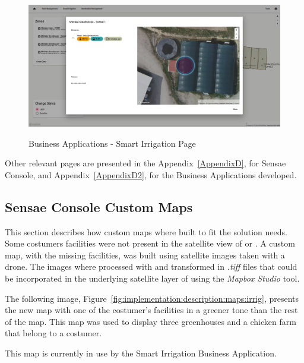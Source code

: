 \begin{figure}[H]
    \centering
    \resizebox{\columnwidth}{!}
    {
       \includegraphics{assets/figures/ui/smart-irrigation.png}
    }
    \caption[Business Applications - Smart Irrigation Page]{Business Applications - Smart Irrigation Page}
    \label{fig:implementation:description:ui:smartirrigation}
\end{figure}

Other relevant pages are presented in the Appendix~\ref{AppendixD}, for Sensae Console, and Appendix~\ref{AppendixD2}, for the Business Applications developed.

\subsection{Sensae Console Custom Maps}
\label{subsec:implementation:description:maps}

This section describes how custom maps where built to fit the solution needs. Some costumers facilities were not present in the satellite view of  or . A custom map, with the missing facilities, was built using satellite images taken with a drone. The images where processed with  and transformed in \textit{.tiff} files that could be incorporated in the underlying satellite layer of  using the \textit{Mapbox Studio} tool.

The following image, Figure~\ref{fig:implementation:description:maps:irrig}, presents the new map with one of the costumer's facilities in a greener tone than the rest of the map. This map was used to display three greenhouses and a chicken farm that belong to a costumer.

This map is currently in use by the Smart Irrigation Business Application.

